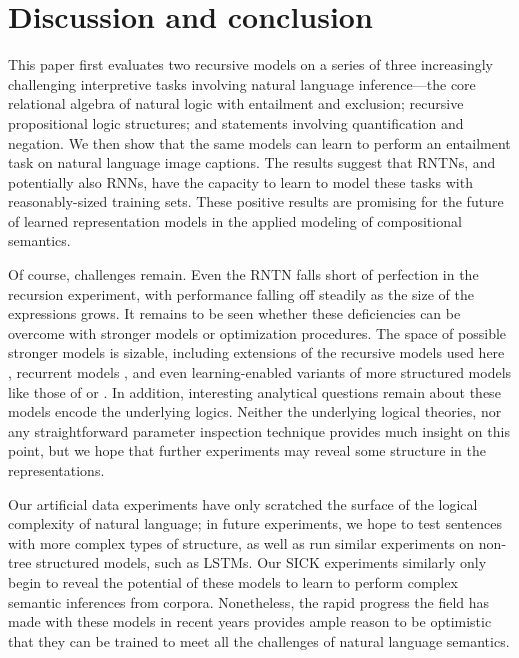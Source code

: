 \section{Discussion and conclusion}\label{sec:discussion}

This paper first evaluates two recursive models on a series of three increasingly
challenging interpretive tasks involving natural language inference---the 
core relational algebra of natural logic with entailment and
exclusion; recursive propositional logic structures; and statements
involving quantification and negation. We then show that the same models can learn to
perform an entailment task on natural language image captions. The results suggest that RNTNs,
and potentially also RNNs, have the capacity to learn to model these tasks with 
reasonably-sized training sets. These positive results are
promising for the future of learned representation models in the
applied modeling of compositional semantics.

Of course, challenges remain. Even
the RNTN falls short of perfection in the recursion experiment, with
performance falling off steadily as the size of the expressions grows. It
remains to be seen whether these deficiencies can be overcome with
stronger models or optimization procedures. The space of possible stronger
models is sizable, including extensions of the recursive models used here
\cite{sochergrounded,kalchbrenner2014convolutional,irsoydeep}, recurrent
models \cite{sutskever2014sequence}, and even learning-enabled variants 
of more structured models like those of  or .
In addition, interesting analytical questions remain about  these models encode
the underlying logics. Neither the underlying
logical theories, nor any straightforward parameter inspection technique provides 
much insight on this point, but we hope that further experiments may reveal 
some structure in the representations.

Our artificial data experiments have only scratched the surface 
of the logical complexity of natural language; in future experiments, we hope to test sentences
with more complex types of structure, as well as run similar experiments on non-tree structured models, such as LSTMs. Our SICK experiments 
similarly only begin to reveal the potential of these models to learn to 
perform complex semantic inferences from corpora. Nonetheless, the
rapid progress the field has made with these models in recent years
provides ample reason to be optimistic that they can be trained to
meet all the challenges of natural language semantics.

